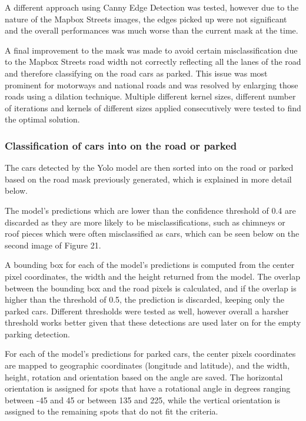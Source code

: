 A different approach using Canny Edge Detection was tested, however due to the
nature of the Mapbox Streets images, the edges picked up were not significant
and the overall performances was much worse than the current mask at the time.

A final improvement to the mask was made to avoid certain misclassification due
to the Mapbox Streets road width not correctly reflecting all the lanes of the
road and therefore classifying on the road cars as parked. This issue was most
prominent for motorways and national roads and was resolved by enlarging those
roads using a dilation technique. Multiple different kernel sizes, different
number of iterations and kernels of different sizes applied consecutively were
tested to find the optimal solution.

\newpage{}

\subsubsection{Classification of cars into on the road or parked}
The cars detected by the Yolo model are then sorted into on the road or parked
based on the road mask previously generated, which is explained in more detail
below.

The model's predictions which are lower than the confidence threshold of 0.4 are
discarded as they are more likely to be misclassifications, such as chimneys or
roof pieces which were often misclassified as cars, which can be seen below on
the second image of Figure 21.

A bounding box for each of the model's predictions is computed from the center
pixel coordinates, the width and the height returned from the model. The overlap
between the bounding box and the road pixels is calculated, and if the overlap
is higher than the threshold of 0.5, the prediction is discarded, keeping only
the parked cars. Different thresholds were tested as well, however overall a
harsher threshold works better given that these detections are used later on for
the empty parking detection.

For each of the model's predictions for parked cars, the center pixels
coordinates are mapped to geographic coordinates (longitude and latitude), and
the width, height, rotation and orientation based on the angle are saved. The
horizontal orientation is assigned for spots that have a rotational angle in
degrees ranging between -45 and 45 or between 135 and 225, while the vertical
orientation is assigned to the remaining spots that do not fit the criteria.

